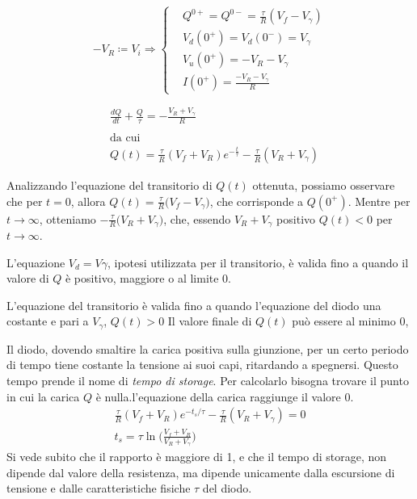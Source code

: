 \documentclass[../elettronica]{subfiles}
\begin{document}
\begin{minipage}{.47\textwidth}
    \begin{tcolorbox}[title={Condizioni iniziali $t = 0^+$}]
        \[
            -V_R \coloneqq V_i \Rightarrow
            \begin{cases}
            &Q^{0+} = Q^{0-} = \frac{\tau}{R}(V_f - V_\gamma)\\
            &V_d(0^+) = V_d(0^-) = V_\gamma\\
            &V_u(0^+) = -V_R - V_\gamma\\
            &I(0^+) = \frac{-V_R - V_\gamma}{R}
        \end{cases}
        \]
    \end{tcolorbox}
\end{minipage}
\begin{minipage}{.47\textwidth}
    \begin{tcolorbox}[title={Circuito a $t > 0$}]
        \begin{align*}
            &\frac{dQ}{dt} + \frac{Q}{\tau} = -\frac{V_R + V_\gamma}{R}\\
            \\
            &\text{da cui}
            \\
            &Q(t) = \frac{\tau}{R}(V_f + V_R) e ^ {-\frac{t}{\tau}} - \frac{\tau}{R}(V_R + V_\gamma)
        \end{align*}
    \end{tcolorbox}
\end{minipage}


Analizzando l'equazione del transitorio di $Q(t)$ ottenuta, possiamo osservare che per $t = 0$,
allora $Q(t) = \frac{\tau}{R}\big(V_f - V_\gamma\big)$, che corrisponde a $Q(0^+)$.
Mentre per $t \to \infty$, otteniamo $-\frac{\tau}{R}\big(V_R + V_\gamma)$, che, essendo $V_R + V_\gamma$ positivo
$Q(t) < 0$ per $t \to \infty$.

L'equazione $V_d = V\gamma$, ipotesi utilizzata per il transitorio, è valida fino a quando il valore
di $Q$ è positivo, maggiore o al limite 0.


L'equazione del transitorio è valida fino a quando l'equazione del diodo una costante e pari a $V_\gamma$, $Q(t) > 0$
Il valore finale di $Q(t)$ può essere al minimo 0,

Il diodo, dovendo smaltire la carica positiva sulla giunzione, per un certo periodo di tempo tiene costante
la tensione ai suoi capi, ritardando a spegnersi. Questo tempo prende il nome di \textit{tempo di storage}.
Per calcolarlo bisogna trovare il punto in cui la carica $Q$ è nulla.l'equazione della carica raggiunge il valore 0.
\begin{align*}
    \frac{\tau}{R}(V_f + V_R) e ^ {-t_s/\tau} - \frac{\tau}{R}(V_R + V_\gamma) = 0
    \\
    t_s = \tau \ln\Big(\frac{V_f + V_R}{V_R + V_\gamma}\Big)
\end{align*}
Si vede subito che il rapporto è maggiore di 1, e che il tempo di storage, non dipende dal valore della resistenza,
ma dipende unicamente dalla escursione di tensione e dalle caratteristiche fisiche $\tau$ del diodo.
\end{document}
